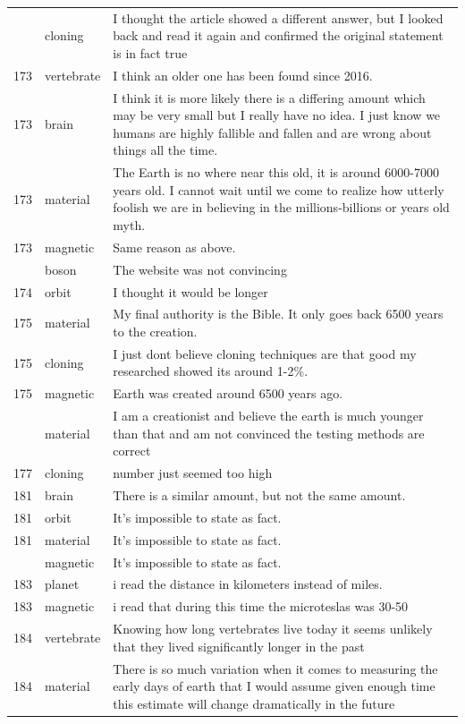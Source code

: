 \documentclass[
  doc,floatsintext]{apa6}
\begin{document}
\begin{longtable}[t]{>{}r>{}l>{\raggedright\arraybackslash}p{30em}}
\addlinespace
172 & cloning & I thought the article showed a different answer, but I looked back and read it again and confirmed the original statement is in fact true\\
173 & vertebrate & I think an older one has been found since 2016.\\
173 & brain & I think it is more likely there is a differing amount which may be very small but I really have no idea. I just know we humans are highly fallible and fallen and are wrong about things all the time.\\
173 & material & The Earth is no where near this old, it is around 6000-7000 years old. I cannot wait until we come to realize how utterly foolish we are in believing in the millions-billions or years old myth.\\
173 & magnetic & Same reason as above.\\
\addlinespace
174 & boson & The website was not convincing\\
174 & orbit & I thought it would be longer\\
175 & material & My final authority is the Bible.  It only goes back 6500 years to the creation.\\
175 & cloning & I just dont believe cloning techniques are that good my researched showed its around 1-2\%.\\
175 & magnetic & Earth was created around 6500 years ago.\\
\addlinespace
177 & material & I am a creationist and believe the earth is much younger than that and am not convinced the testing methods are correct\\
177 & cloning & number just seemed too high\\
181 & brain & There is a similar amount, but not the same amount.\\
181 & orbit & It's impossible to state as fact.\\
181 & material & It's impossible to state as fact.\\
\addlinespace
181 & magnetic & It's impossible to state as fact.\\
183 & planet & i read the distance in kilometers instead of miles.\\
183 & magnetic & i read that during this time the microteslas was 30-50\\
184 & vertebrate & Knowing how long vertebrates live today it seems unlikely that they lived significantly longer in the past\\
184 & material & There is so much variation when it comes to measuring the early days of earth that I would assume given enough time this estimate will change dramatically in the future\\

\end{longtable}
\end{document}

